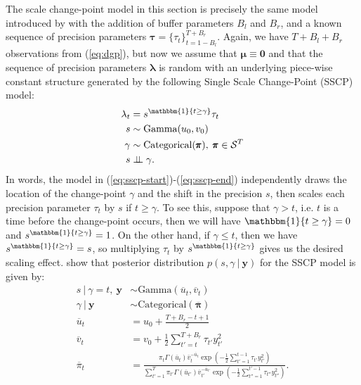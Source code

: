 The scale change-point model in this section is precisely the same model introduced by \cite{Cappello22} with the addition of buffer parameters $B_l$ and $B_r$, and a known sequence of precision parameters $\pmb{\tau}=\{\tau_t\}_{t={1-B_l}}^{T+B_r}$. Again, we have $T+B_l+B_r$ observations from (\ref{eq:dgp}), but now we assume that $\pmb{\mu} \equiv \mathbf{0}$ and that the sequence of precision parameters $\pmb{\lambda}$ is random with an underlying piece-wise constant structure generated by the following Single Scale Change-Point (SSCP) model:
\begin{align}\label{eq:sscp-start}
    \lambda_t &= s^{\mathbbm{1}\{t \geq \gamma\}}\tau_t  \\
    s &\sim \text{Gamma}(u_0,v_0) \\
    \gamma &\sim \text{Categorical}(\pmb{\pi}),\; \pmb{\pi} \in \mathcal{S}^T \\
    s &\indep \gamma.
    \label{eq:sscp-end}
\end{align}
In words, the model in (\ref{eq:sscp-start})-(\ref{eq:sscp-end}) independently draws the location of the change-point $\gamma$ and the shift in the precision $s$, then scales each precision parameter $\tau_t$ by $s$ if $t \geq \gamma$. To see this, suppose that $\gamma > t$, i.e. $t$ is a time before the change-point occurs, then we will have $\mathbbm{1}\{t \geq \gamma\} = 0$ and $s^{\mathbbm{1}\{t \geq \gamma\}} = 1$. On the other hand, if $\gamma \leq t$, then we have $s^{\mathbbm{1}\{t \geq \gamma\}} = s$, so multiplying $\tau_t$ by $s^{\mathbbm{1}\{t \geq \gamma\}}$ gives us the desired scaling effect. \cite{Cappello22} show that posterior distribution $p(s, \gamma\:|\:\mathbf{y})$ for the SSCP model is given by:
\begin{align}
    s \:|\: \gamma = t, \: \mathbf{y} &\sim \text{Gamma}\left(\overline{u}_{t}, \overline{v}_{t}\right) \label{eq:s-sscp} \\
    \gamma \:|\: \mathbf{y}&\sim \text{Categorical}(\overline{\pmb{\pi}}) \label{eq:gamma-sscp}\\
    \overline{u}_{t} &= u_0 + \frac{T +B_r - t + 1}{2} \\
    \overline{v}_{t} &= v_0 + \frac{1}{2} \sum_{t'=t}^{T+B_r} \tau_{t'}y_{t'}^2 \\
    \overline{\pi}_t &= \frac{\pi_t \Gamma(\overline{u}_{t}) \overline{v}_{t}^{-\overline{u}_{t}}\exp\left(- \frac{1}{2}\sum_{t'=1}^{t-1} \tau_{t'}y_{t'}^2\right)}{\sum_{t'=1}^T \pi_{t'} \Gamma(\overline{u}_{t'}) \overline{v}_{t'}^{-\overline{u}_{t'}}\exp\left(- \frac{1}{2}\sum_{t''=1}^{t'-1} \tau_{t''}y_{t''}^2\right)}. \label{eq:pi-sscp}
\end{align}
